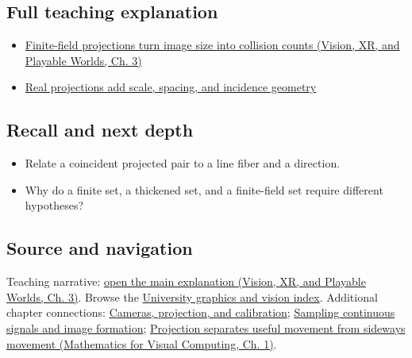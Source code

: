 \subsection{Full teaching explanation}\label{appendix-3c73f7862157-full-teaching-explanation}

\hypertarget{appendix-3c73f7862157-full-teaching-explanation}{}

\begin{itemize}
\tightlist
\item
  \href{../07-Vision-XR-and-Playable-Worlds/main.pdf\#nameddest=04-visual-computing-ii-ch032-finite-field-projections-turn-image-size-into-collision-counts}{Finite-field projections turn image size into collision counts (Vision, XR, and Playable Worlds, Ch. 3)}
\item
  \hyperref[04-visual-computing-ii-ch033-real-projections-add-scale-spacing-and-incidence-geometry]{Real projections add scale, spacing, and incidence geometry}
\end{itemize}

\subsection{Recall and next depth}\label{appendix-3c73f7862157-recall-and-next-depth}

\hypertarget{appendix-3c73f7862157-recall-and-next-depth}{}

\begin{itemize}
\tightlist
\item
  Relate a coincident projected pair to a line fiber and a direction.
\item
  Why do a finite set, a thickened set, and a finite-field set require different hypotheses?
\end{itemize}

\subsection{Source and navigation}\label{appendix-3c73f7862157-source-and-navigation}

\hypertarget{appendix-3c73f7862157-source-and-navigation}{}

Teaching narrative: \href{../07-Vision-XR-and-Playable-Worlds/main.pdf\#nameddest=04-visual-computing-ii-ch032-finite-field-projections-turn-image-size-into-collision-counts}{open the main explanation (Vision, XR, and Playable Worlds, Ch. 3)}. Browse the \hyperref[appendix-a6d556a4ef50-university-graphics-vision-and-photography---independent-series]{University graphics and vision index}. Additional chapter connections: \hyperref[03-visual-computing-i-ch003-cameras-projection-and-calibration]{Cameras, projection, and calibration}; \hyperref[03-visual-computing-i-ch003-sampling-continuous-signals-and-image-formation]{Sampling continuous signals and image formation}; \href{../02-Mathematics-for-Visual-Computing/main.pdf\#nameddest=01-foundations-i-ch017-projection-separates-useful-movement-from-sideways-movement}{Projection separates useful movement from sideways movement (Mathematics for Visual Computing, Ch. 1)}.

